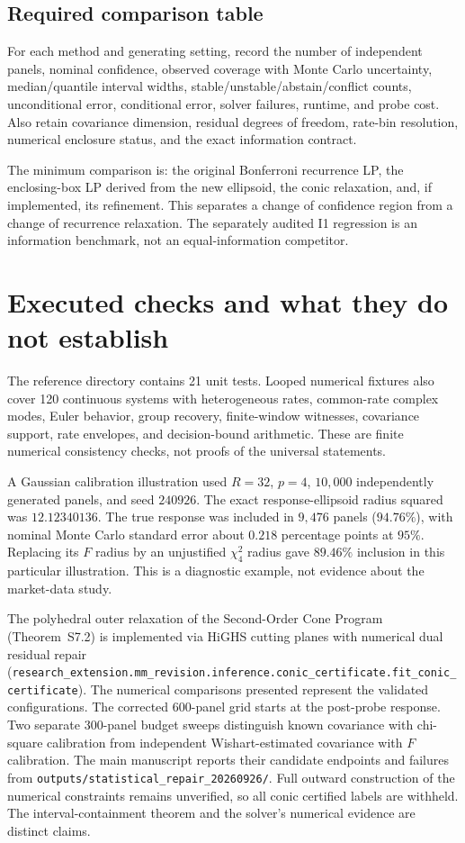 \documentclass[11pt,a4paper]{article}
\theoremstyle{definition}\newtheorem{definition}[theorem]{Definition}
\theoremstyle{remark}\newtheorem{remark}[theorem]{Remark}
\begin{document}
\subsection{Required comparison table}
For each method and generating setting, record the number of independent panels, nominal confidence, observed coverage with Monte Carlo uncertainty, median/quantile interval widths, stable/unstable/abstain/conflict counts, unconditional error, conditional error, solver failures, runtime, and probe cost. Also retain covariance dimension, residual degrees of freedom, rate-bin resolution, numerical enclosure status, and the exact information contract.

The minimum comparison is: the original Bonferroni recurrence LP, the enclosing-box LP derived from the new ellipsoid, the conic relaxation, and, if implemented, its refinement. This separates a change of confidence region from a change of recurrence relaxation. The separately audited I1 regression is an information benchmark, not an equal-information competitor.

\section{Executed checks and what they do not establish}
The reference directory contains 21 unit tests. Looped numerical fixtures also cover 120 continuous systems with heterogeneous rates, common-rate complex modes, Euler behavior, group recovery, finite-window witnesses, covariance support, rate envelopes, and decision-bound arithmetic. These are finite numerical consistency checks, not proofs of the universal statements.

A Gaussian calibration illustration used $R=32$, $p=4$, $10{,}000$ independently generated panels, and seed $240926$. The exact response-ellipsoid radius squared was $12.12340136$. The true response was included in $9{,}476$ panels ($94.76\%$), with nominal Monte Carlo standard error about $0.218$ percentage points at $95\%$. Replacing its $F$ radius by an unjustified $\chi^2_4$ radius gave $89.46\%$ inclusion in this particular illustration. This is a diagnostic example, not evidence about the market-data study.

The polyhedral outer relaxation of the Second-Order Cone Program (Theorem~S7.2) is implemented via HiGHS cutting planes with numerical dual residual repair (\nolinkurl{research_extension.mm_revision.inference.conic_certificate.fit_conic_certificate}). The numerical comparisons presented represent the validated configurations. The corrected 600-panel grid starts at the post-probe response. Two separate 300-panel budget sweeps distinguish known covariance with chi-square calibration from independent Wishart-estimated covariance with $F$ calibration. The main manuscript reports their candidate endpoints and failures from \nolinkurl{outputs/statistical_repair_20260926/}. Full outward construction of the numerical constraints remains unverified, so all conic certified labels are withheld. The interval-containment theorem and the solver's numerical evidence are distinct claims.
\end{document}
